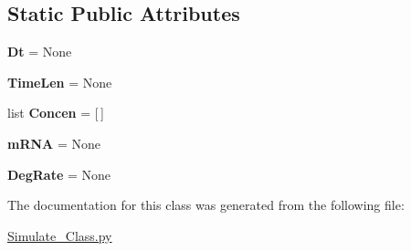 \subsection*{Static Public Attributes}
\begin{DoxyCompactItemize}
\item 
\hypertarget{classweb_1_1_simulate___class_1_1_protein___simulate_a989acf6cadfdaf26684d13f36dc63adb}{{\bfseries Dt} = None}\label{classweb_1_1_simulate___class_1_1_protein___simulate_a989acf6cadfdaf26684d13f36dc63adb}

\item 
\hypertarget{classweb_1_1_simulate___class_1_1_protein___simulate_a50edacbd205b198ab95cdb5fc7f9635e}{{\bfseries Time\-Len} = None}\label{classweb_1_1_simulate___class_1_1_protein___simulate_a50edacbd205b198ab95cdb5fc7f9635e}

\item 
\hypertarget{classweb_1_1_simulate___class_1_1_protein___simulate_a446c78bb62c53d12797f4e15e634b4ac}{list {\bfseries Concen} = \mbox{[}$\,$\mbox{]}}\label{classweb_1_1_simulate___class_1_1_protein___simulate_a446c78bb62c53d12797f4e15e634b4ac}

\item 
\hypertarget{classweb_1_1_simulate___class_1_1_protein___simulate_a7b63979d25ab27dceed5ec84fb2d1345}{{\bfseries m\-R\-N\-A} = None}\label{classweb_1_1_simulate___class_1_1_protein___simulate_a7b63979d25ab27dceed5ec84fb2d1345}

\item 
\hypertarget{classweb_1_1_simulate___class_1_1_protein___simulate_adbb5f457e3feae482778dd6fe5ff7788}{{\bfseries Deg\-Rate} = None}\label{classweb_1_1_simulate___class_1_1_protein___simulate_adbb5f457e3feae482778dd6fe5ff7788}

\end{DoxyCompactItemize}


The documentation for this class was generated from the following file\-:\begin{DoxyCompactItemize}
\item 
\hyperlink{_simulate___class_8py}{Simulate\-\_\-\-Class.\-py}\end{DoxyCompactItemize}
